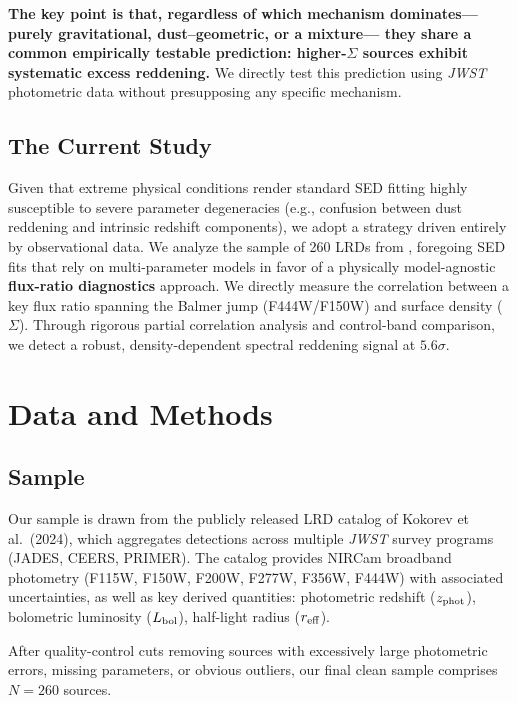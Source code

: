 \documentclass[apjl,twocolumn,longbibliography,linenumbers]{aastex701}
\begin{document}
\textbf{The key point is that, regardless of which mechanism dominates---
purely gravitational, dust--geometric, or a mixture---
they share a common empirically testable prediction:
higher-$\Sigma$ sources exhibit systematic excess reddening.}
We directly test this prediction using \textit{JWST} photometric data
without presupposing any specific mechanism.

\subsection{The Current Study}

Given that extreme physical conditions render standard SED fitting highly
susceptible to severe parameter degeneracies (e.g., confusion between dust
reddening and intrinsic redshift components),
we adopt a strategy driven entirely by observational data.
We analyze the sample of 260 LRDs from \cite{Kokorev2024}, foregoing
SED fits that rely on multi-parameter models in favor of a physically
model-agnostic \textbf{flux-ratio diagnostics} approach.
We directly measure the correlation between a key flux ratio spanning the Balmer
jump (F444W/F150W) and surface density ($\Sigma$).
Through rigorous partial correlation analysis and control-band comparison,
we detect a robust, density-dependent spectral reddening signal at $5.6\sigma$.



\section{Data and Methods}

\subsection{Sample}

Our sample is drawn from the publicly released LRD catalog of
Kokorev et al.\ (2024), which aggregates detections across multiple
\textit{JWST} survey programs (JADES, CEERS, PRIMER).
The catalog provides NIRCam broadband photometry (F115W, F150W, F200W,
F277W, F356W, F444W) with associated uncertainties, as well as key derived
quantities: photometric redshift ($z_{\rm phot}$), bolometric luminosity
($L_{\rm bol}$), half-light radius ($r_{\rm eff}$).

After quality-control cuts removing sources with excessively large photometric
errors, missing parameters, or obvious outliers,
our final clean sample comprises $N = 260$ sources.
\end{document}
